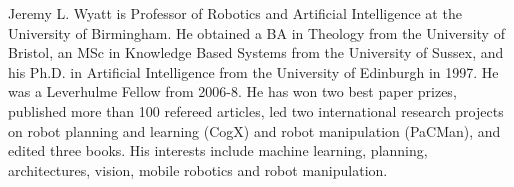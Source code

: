 \documentclass[journal]{IEEEtran}
\begin{document}
\begin{IEEEbiography}{Jeremy L. Wyatt} is Professor of Robotics
  and Artificial Intelligence at the University of Birmingham. He
  obtained a BA in Theology from the University of Bristol, an MSc in
  Knowledge Based Systems from the University of Sussex, and his
  Ph.D. in Artificial Intelligence from the University of Edinburgh in
  1997. He was a Leverhulme Fellow from 2006-8. He has won two best paper prizes, published more than 100 refereed articles, led two international research projects on robot planning and learning (CogX) and robot manipulation (PaCMan), and edited three books. His interests
  include machine learning, planning, architectures, vision, mobile robotics and robot manipulation.
\end{IEEEbiography}

\vfill



\end{document}
